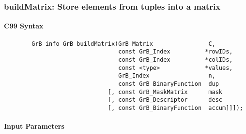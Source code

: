 \subsubsection{{\sf buildMatrix}: Store elements from tuples into a matrix}


\paragraph{C99 Syntax}

\begin{verbatim}
        GrB_info GrB_buildMatrix(GrB_Matrix                C,
                                 const GrB_Index          *rowIDs,
                                 const GrB_Index          *colIDs, 
                                 const <type>             *values,
                                 GrB_Index                 n,
                                 const GrB_BinaryFunction  dup
                              [, const GrB_MaskMatrix      mask
                              [, const GrB_Descriptor      desc
                              [, const GrB_BinaryFunction  accum]]]);
\end{verbatim}

\paragraph{Input Parameters}

